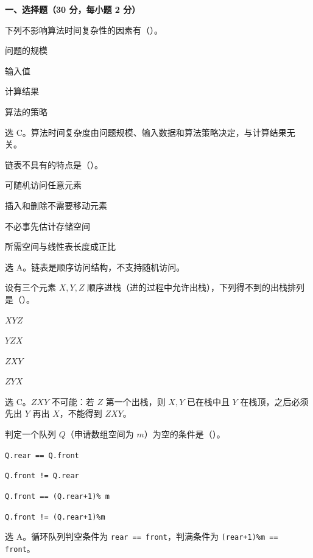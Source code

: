 \textbf{一、选择题（30 分，每小题 2 分）}

\begin{question}
下列不影响算法时间复杂性的因素有（\quad）。
\begin{choiceoptions}[2]
  \item 问题的规模
  \item 输入值
  \item 计算结果
  \item 算法的策略
\end{choiceoptions}
\begin{solution}
选 C。算法时间复杂度由问题规模、输入数据和算法策略决定，与计算结果无关。
\end{solution}
\end{question}

\begin{question}
链表不具有的特点是（\quad）。
\begin{choiceoptions}[2]
  \item 可随机访问任意元素
  \item 插入和删除不需要移动元素
  \item 不必事先估计存储空间
  \item 所需空间与线性表长度成正比
\end{choiceoptions}
\begin{solution}
选 A。链表是顺序访问结构，不支持随机访问。
\end{solution}
\end{question}

\begin{question}
设有三个元素 $X,Y,Z$ 顺序进栈（进的过程中允许出栈），下列得不到的出栈排列是（\quad）。
\begin{choiceoptions}[2]
  \item $XYZ$
  \item $YZX$
  \item $ZXY$
  \item $ZYX$
\end{choiceoptions}
\begin{solution}
选 C。$ZXY$ 不可能：若 $Z$ 第一个出栈，则 $X,Y$ 已在栈中且 $Y$ 在栈顶，之后必须先出 $Y$ 再出 $X$，不能得到 $ZXY$。
\end{solution}
\end{question}

\begin{question}
判定一个队列 $Q$（申请数组空间为 $m$）为空的条件是（\quad）。
\begin{choiceoptions}[1]
  \item \texttt{Q.rear == Q.front}
  \item \texttt{Q.front != Q.rear}
  \item \texttt{Q.front == (Q.rear+1)\% m}
  \item \texttt{Q.front != (Q.rear+1)\%m}
\end{choiceoptions}
\begin{solution}
选 A。循环队列判空条件为 \texttt{rear == front}，判满条件为 \texttt{(rear+1)\%m == front}。
\end{solution}
\end{question}

